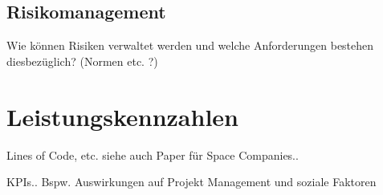 \subsection{Risikomanagement}

Wie können Risiken verwaltet werden und welche Anforderungen bestehen diesbezüglich? (Normen etc. ?)

\section{Leistungskennzahlen} %

Lines of Code, etc.
siehe auch Paper für Space Companies..

KPIs..
Bspw. Auswirkungen auf Projekt Management und soziale Faktoren
